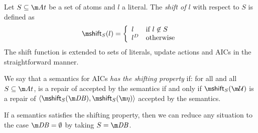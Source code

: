 \begin{definition}
 Let $S\subseteq\atoms$ be a set of atoms and $l$ a literal. The \emph{shift of $l$} with respect to $S$ is defined as 
 \[\shift_S(l) = \left\{\begin{array}{ll}                                                                                                             l&\text{if $l\not\in S$}\\                                                                                                              l^D&\text{otherwise}                                                                                                                                      \end{array}\right.\]
 The shift function is extended to sets of literals, update actions and AICs in the straightforward manner. 
\end{definition}

\begin{definition}
 We say that a semantics for AICs \emph{has the shifting property} if: for all \fulldb and all $S\subseteq \atoms$, \UU is a repair of \fulldb accepted by the semantics if and only if $\shift_S(\UU)$ is a repair of $\langle\shift_S(\db),\shift_S(\aics)\rangle$ accepted by the semantics.
\end{definition}

If a semantics satisfies the shifting property, then we can reduce any situation to the case $\db=\emptyset$ by taking $S=\db$. 
